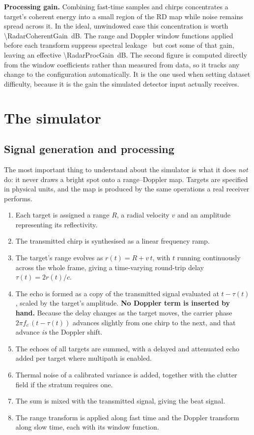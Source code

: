 \textbf{Processing gain.} Combining \RadarN{} fast-time samples and \RadarM{} chirps concentrates a
target's coherent energy into a small region of the RD map while noise remains spread across it. In
the ideal, unwindowed case this concentration is worth \SI{\RadarCoherentGain}{\deci\bel}. The
range and Doppler window functions applied before each transform suppress spectral
leakage~\cite{harris1978windows} but cost
some of that gain, leaving an effective \SI{\RadarProcGain}{\deci\bel}. The second figure is
computed directly from the window coefficients rather than measured from data, so it tracks any
change to the configuration automatically. It is the one used when setting dataset difficulty,
because it is the gain the simulated detector input actually receives.

\section{The simulator}

\subsection{Signal generation and processing}

The most important thing to understand about the simulator is what it does \emph{not} do: it never
draws a bright spot onto a range--Doppler map. Targets are specified in physical units, and the map
is produced by the same operations a real receiver performs.

\begin{enumerate}
\itemsep2pt
\item Each target is assigned a range $R$, a radial velocity $v$ and an amplitude representing its
reflectivity.
\item The transmitted chirp is synthesised as a linear frequency ramp.
\item The target's range evolves as $r(t) = R + v\,t$, with $t$ running continuously across the
whole frame, giving a time-varying round-trip delay $\tau(t) = 2 r(t) / c$.
\item The echo is formed as a copy of the transmitted signal evaluated at $t - \tau(t)$, scaled by
the target's amplitude. \textbf{No Doppler term is inserted by hand.} Because the delay changes as
the target moves, the carrier phase $2\pi f_c\,(t - \tau(t))$ advances slightly from one chirp to
the next, and that advance \emph{is} the Doppler shift.
\item The echoes of all targets are summed, with a delayed and attenuated echo added per target
where multipath is enabled.
\item Thermal noise of a calibrated variance is added, together with the clutter field if the
stratum requires one.
\item The sum is mixed with the transmitted signal, giving the beat signal.
\item The range transform is applied along fast time and the Doppler transform along slow time,
each with its window function.
\end{enumerate}

